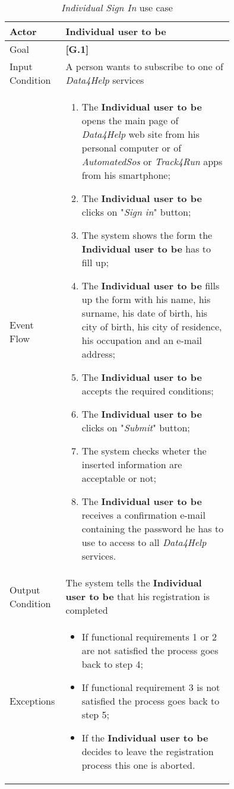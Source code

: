 \begin{center}
\begin{table}
\begin{tabular}{ | l | p{0.75\linewidth} | }
  \hline
    Actor & \textbf{Individual user to be} \\ \hline
    Goal & \textbf{[G.1]} \\ \hline
    Input Condition & A person wants to subscribe to one of \textit{Data4Help} services \\ \hline
    Event Flow & \begin{minipage}[t]{0.7\textwidth}
      \begin{enumerate}
        \item The \textbf{Individual user to be} opens the main page of \textit{Data4Help} web site from his personal computer or of \textit{AutomatedSos} or \textit{Track4Run} apps from his smartphone;
        \item The \textbf{Individual user to be} clicks on "\textit{Sign in}" button;
        \item The system shows the form the \textbf{Individual user to be} has to fill up;
        \item The \textbf{Individual user to be} fills up the form with his name, his surname, his date of birth, his city of birth, his city of residence, his occupation and an e-mail address;
        \item The \textbf{Individual user to be} accepts the required conditions;
        \item The \textbf{Individual user to be} clicks on "\textit{Submit}" button;
        \item The system checks wheter the inserted information are acceptable or not;
        \item The \textbf{Individual user to be} receives a confirmation e-mail containing the password he has to use to access to all \textit{Data4Help} services.
      \end{enumerate}
    \smallskip
  \end{minipage} \\ \hline
  Output Condition & The system tells the \textbf{Individual user to be} that his registration is completed \\ \hline
  Exceptions & \begin{minipage}[t]{0.7\textwidth}
    \begin{itemize}
      \smallskip
      \item If functional requirements 1 or 2 are not satisfied the process goes back to step 4;
      \item If functional requirement 3 is not satisfied the process goes back to step 5;
      \item If the \textbf{Individual user to be} decides to leave the registration process this one is aborted.
    \end{itemize}
    \smallskip
  \end{minipage}  \\ \hline
\end{tabular}
\caption{\textit{Individual Sign In} use case}
\label{table:individualSignInTable}
\end{table}
\end{center}
